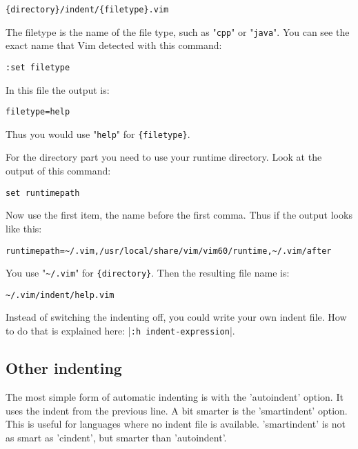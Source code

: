 \begin{Verbatim}[samepage=true]
    {directory}/indent/{filetype}.vim
\end{Verbatim}

The {filetype} is the name of the file type, such as "\verb!cpp!" or "\verb!java!".
You can see the exact name that Vim detected with this command:

\begin{Verbatim}[samepage=true]
 :set filetype
\end{Verbatim}

In this file the output is:

\begin{Verbatim}[samepage=true]
    filetype=help 
\end{Verbatim}

Thus you would use "\verb!help!" for \verb!{filetype}!.

For the {directory} part you need to use your runtime directory.
Look at the output of this command:

\begin{Verbatim}[samepage=true]
 set runtimepath
\end{Verbatim}

Now use the first item, the name before the first comma.
Thus if the output looks like this:

\begin{Verbatim}[samepage=true]
    runtimepath=~/.vim,/usr/local/share/vim/vim60/runtime,~/.vim/after 
\end{Verbatim}

You use "\verb!~/.vim!" for \verb!{directory}!.
Then the resulting file name is:

\begin{Verbatim}[samepage=true]
    ~/.vim/indent/help.vim 
\end{Verbatim}

Instead of switching the indenting off, you could write your own indent file.
How to do that is explained here: |\verb!:h indent-expression!|.
\subsection{Other indenting}
The most simple form of automatic indenting is with the 'autoindent' option.
It uses the indent from the previous line.
A bit smarter is the 'smartindent' option.
This is useful for languages where no indent file is available.
'smartindent' is not as smart as 'cindent', but smarter than 'autoindent'.

